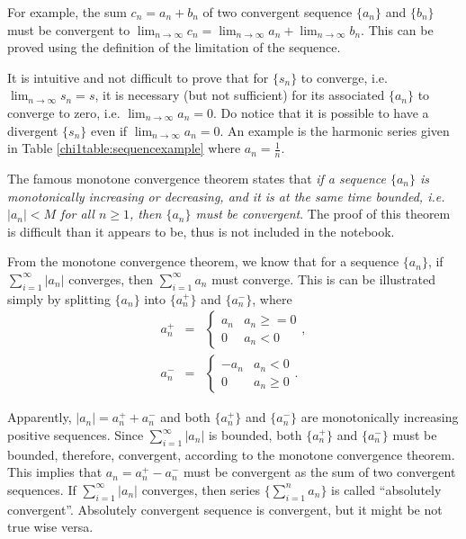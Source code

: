 For example, the sum $c_n = a_n + b_n$ of two convergent sequence $\{a_n\}$ and $\{b_n\}$ must be convergent to $\lim_{n \rightarrow \infty}c_n = \lim_{n \rightarrow \infty}a_n + \lim_{n \rightarrow \infty}b_n$. This can be proved using the definition of the limitation of the sequence.

It is intuitive and not difficult to prove that for $\{s_n\}$ to converge, i.e. $\lim_{n\rightarrow\infty}s_n = s$, it is necessary (but not sufficient) for its associated $\{a_n\}$ to converge to zero, i.e. $\lim_{n\rightarrow\infty}a_n = 0$. Do notice that it is possible to have a divergent $\{s_n\}$ even if $\lim_{n\rightarrow\infty}a_n = 0$. An example is the harmonic series given in Table \ref{chi1table:sequencexample} where $a_n = \frac{1}{n}$.

The famous monotone convergence theorem states that \textit{if a sequence $\{a_n\}$ is monotonically increasing or decreasing, and it is at the same time bounded, i.e. $|a_n| < M$ for all $n\geq1$, then $\{a_n\}$ must be convergent}. The proof of this theorem is difficult than it appears to be, thus is not included in the notebook.

From the monotone convergence theorem, we know that for a sequence $\{a_n\}$, if $\sum_{i=1}^{\infty}|a_n|$ converges, then $\sum_{i=1}^{\infty}a_n$ must converge. This is can be illustrated simply by splitting $\{a_n\}$ into $\{a_n^+\}$ and $\{a_n^-\}$, where
\begin{eqnarray}
  a_n^+ &=& \left\{\begin{array}{cc}
                     a_n & a_n \geq = 0 \\
                     0 & a_n < 0
                   \end{array}\right.,  \nonumber \\
  a_n^- &=& \left\{\begin{array}{cc}
                     -a_n & a_n < 0 \\
                     0 & a_n \geq 0
                   \end{array}\right.. \nonumber
\end{eqnarray}

Apparently, $|a_n| = a_n^+ + a_n^-$ and both $\{a_n^+\}$ and $\{a_n^-\}$ are monotonically increasing positive sequences. Since $\sum_{i=1}^{\infty}|a_n|$ is bounded, both $\{a_n^+\}$ and $\{a_n^-\}$ must be bounded, therefore, convergent, according to the monotone convergence theorem. This implies that $a_n = a_n^+ - a_n^-$ must be convergent as the sum of two convergent sequences. If $\sum_{i=1}^{\infty}|a_n|$ converges, then series $\{\sum_{i=1}^{n}a_n\}$ is called ``absolutely convergent''. Absolutely convergent sequence is convergent, but it might be not true wise versa.

